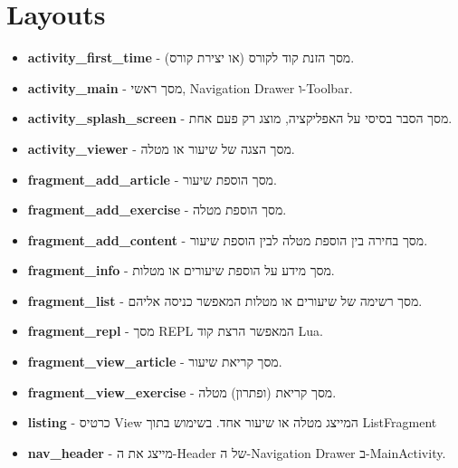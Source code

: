 \section{Layouts}

\begin{itemize}
  \item \textbf{activity\_first\_time} - מסך הזנת קוד לקורס (או יצירת קורס).
  \item \textbf{activity\_main} - מסך ראשי, Navigation Drawer ו-Toolbar.
  \item \textbf{activity\_splash\_screen} - מסך הסבר בסיסי על האפליקציה, מוצג רק פעם אחת.
  \item \textbf{activity\_viewer} - מסך הצגה של שיעור או מטלה.
  \item \textbf{fragment\_add\_article} - מסך הוספת שיעור.
  \item \textbf{fragment\_add\_exercise} - מסך הוספת מטלה.
  \item \textbf{fragment\_add\_content} - מסך בחירה בין הוספת מטלה לבין הוספת שיעור.
  \item \textbf{fragment\_info} - מסך מידע על הוספת שיעורים או מטלות.
  \item \textbf{fragment\_list} - מסך רשימה של שיעורים או מטלות המאפשר כניסה אליהם.
  \item \textbf{fragment\_repl} - מסך REPL המאפשר הרצת קוד Lua.
  \item \textbf{fragment\_view\_article} - מסך קריאת שיעור.
  \item \textbf{fragment\_view\_exercise} - מסך קריאת (ופתרון) מטלה.
  \item \textbf{listing} - כרטיס View המייצג מטלה או שיעור אחד. בשימוש בתוך ListFragment
  \item \textbf{nav\_header} - מייצג את ה-Header של ה-Navigation Drawer ב-MainActivity.

\end{itemize}